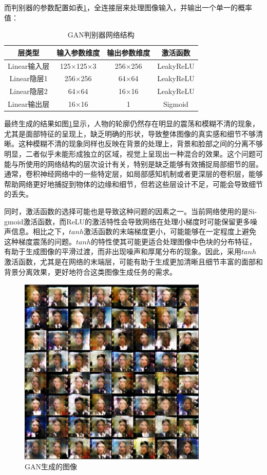 \documentclass[UTF8]{ctexart}
\begin{document}
而判别器的参数配置如表\ref{tab:dis_gan}，全连接层来处理图像输入，并输出一个单一的概率值：
\begin{table}[htbp]
\centering
\caption{GAN判别器网络结构}
\label{tab:dis_gan}
\begin{tabular}{cccc}
\toprule[1.5pt]
\textbf{层类型} & \textbf{输入参数维度} & \textbf{输出参数维度} & \textbf{激活函数} \\
\midrule[1.5pt]
Linear输入层 & 125$\times$125$\times$3 & 256$\times$256 & LeakyReLU \\
Linear隐层1 & 256$\times$256 & 64$\times$64 & LeakyReLU \\
Linear隐层2 & 64$\times$64 & 16$\times$16 & LeakyReLU \\
Linear输出层 & 16$\times$16 & 1 & Sigmoid \\
\bottomrule[1.0pt]
\end{tabular}
\end{table}
最终生成的结果如图\ref{fig:GAN}显示，人物的轮廓仍然存在明显的震荡和模糊不清的现象，尤其是面部特征的呈现上，缺乏明确的形状，导致整体图像的真实感和细节不够清晰。这种模糊不清的现象同样也反映在背景的处理上，背景和脸部之间的分离不够明显，二者似乎未能形成独立的区域，视觉上呈现出一种混合的效果。这个问题可能与所使用的网络结构的层次设计有关，特别是缺乏能够有效捕捉局部细节的层。通常，卷积神经网络中的一些特定层，如局部感知机制或者更深层的卷积层，能够帮助网络更好地捕捉到物体的边缘和细节，但若这些层设计不足，可能会导致细节的丢失。\par
同时，激活函数的选择可能也是导致这种问题的因素之一。当前网络使用的是Si-\\gmoid激活函数，而ReLU的激活特性会导致网络在处理小梯度时可能保留更多噪声信息。相比之下，$tanh$激活函数的末端梯度更小，可能能够在一定程度上避免这种梯度震荡的问题。$tanh$的特性使其可能更适合处理图像中色块的分布特征，有助于生成图像的平滑过渡，而非出现噪声和厚尾分布的现象。因此，采用$tanh$激活函数，尤其是在网络的末端层，可能有助于生成更加清晰且细节丰富的面部和背景分离效果，更好地符合这类图像生成任务的需求。
\begin{figure}[htbp]
\centering
\includegraphics[width=0.8\textwidth]{./images/GAN.png}
\caption{GAN生成的图像}
\label{fig:GAN}
\end{figure}
\end{document}
